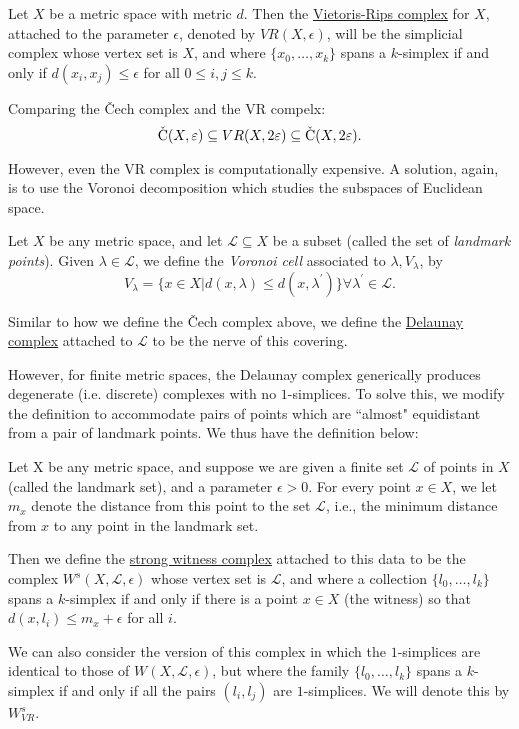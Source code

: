 \begin{defn}
	Let $X$ be a metric space with metric $d$. Then the  \underline{Vietoris-Rips complex} for $X$, attached to the parameter $\epsilon$, denoted by $VR(X,\epsilon)$, will be the simplicial complex whose vertex set is $X$, and where $\{x_0,\dots, x_k\}$ spans a $k$-simplex if and only if $d(x_i,x_j) \leq \epsilon$ for all $0\leq i,j\leq k.$
\end{defn}

\begin{prop}
	Comparing the \v{C}ech complex and the VR compelx:
	$$ \operatorname{\check{C}}(X,\varepsilon) \subseteq VR (X,2\varepsilon) \subseteq \operatorname{\check{C}}(X,2\varepsilon).$$
\end{prop}

However, even the VR complex is computationally expensive. A solution, again, is to use the Voronoi decomposition which studies the subspaces of Euclidean space. 

\begin{thm}
	Let $X$ be any metric space, and let $\mathcal{L}\subseteq X$ be a subset (called the set of \textit{landmark points}). Given $\lambda \in \mathcal{L}$, we define the \textit{Voronoi cell} associated to $\lambda, V_\lambda$, by
	$$V_\lambda = \{x\in X| d(x,\lambda) \leq d(x,\lambda^\prime)\} \forall \lambda^\prime \in \mathcal{L}.$$
\end{thm}


\begin{defn}
	Similar to how we define the \v{C}ech complex above, we define the \underline{Delaunay complex} attached to $\mathcal{L}$ to be the nerve of this covering.
\end{defn}

However, for finite metric spaces, the Delaunay complex generically produces degenerate (i.e. discrete) complexes with no $1$-simplices. To solve this, we modify the definition to accommodate pairs of points which are ``almost" equidistant from a pair of landmark points. We thus have the definition below: 

\begin{defn}
	Let X be any metric space, and suppose we are given a finite set $\mathcal{L}$ of points in $X$ (called the landmark set), and a parameter $\epsilon> 0$. For every point $x \in X$, we let $m_x$ denote the distance from this point to the set $\mathcal{L}$, i.e., the minimum distance from $x$ to any point in the landmark set.
	
	Then we define the \underline{strong witness complex} attached to this data to be the complex $W^s(X,\mathcal{L}, \epsilon)$ whose vertex set is $\mathcal{L}$, and where a collection $\{l_0, \dots, l_k\}$ spans a $k$-simplex if and only if there is a point $x \in X$ (the witness) so that $d(x, l_i)\leq m_x + \epsilon$ for all $i$. 
	
	We can also consider the version of this complex in which the $1$-simplices are identical to those of $W(X,\mathcal{L},\epsilon)$, but where the family $\{l_0, \dots, l_k\}$ spans a $k$-simplex if and only if all the pairs $(l_i, l_j)$ are $1$-simplices. We will denote this by $W^s_{VR}$.
\end{defn}

